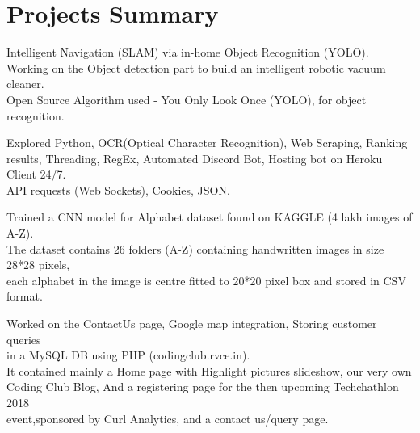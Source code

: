 \documentclass[]{deedy-resume-openfont}
\begin{document}







\section{Projects Summary}

\textbullet{} Intelligent Navigation (SLAM) via in-home Object Recognition (YOLO).\\
\textbullet{} Working on the Object detection part to build an intelligent robotic vacuum cleaner.\\ 
\textbullet{} Open Source Algorithm used -  You Only Look Once (YOLO), for object recognition.



\textbullet{} Explored Python, OCR(Optical Character Recognition), Web Scraping, Ranking results, Threading, RegEx, Automated Discord Bot, Hosting bot on Heroku Client 24/7.  \\
\textbullet{} API requests (Web Sockets), Cookies, JSON.

\textbullet{} Trained a CNN model for Alphabet dataset found on KAGGLE (4 lakh images of A-Z).\\
\textbullet{} The dataset contains 26 folders (A-Z) containing handwritten images in size 28*28 pixels, \\each alphabet in the image is centre fitted to 20*20 pixel box and stored in CSV format.


\textbullet{} Worked on the ContactUs page, Google map integration, Storing customer queries \\in a MySQL DB using PHP (codingclub.rvce.in).\\
\textbullet{} It contained mainly a Home page with Highlight pictures slideshow, our very own\\ Coding Club Blog, And a registering page for the then upcoming Techchathlon 2018\\ event,sponsored by Curl Analytics, and a contact us/query page.
\\
\end{document}
